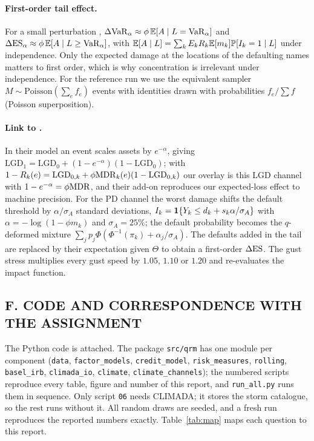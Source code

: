 \paragraph{First-order tail effect.} For a small perturbation \citep{Gourieroux00}, $\Delta\mathrm{VaR}_\alpha\approx\phi\,\mathbb{E}[A\mid L=\mathrm{VaR}_\alpha]$ and $\Delta\mathrm{ES}_\alpha\approx\phi\,\mathbb{E}[A\mid L\ge\mathrm{VaR}_\alpha]$, with $\mathbb{E}[A\mid L]=\sum_kE_kR_k\mathbb{E}[m_k]\mathbb{P}[I_k=1\mid L]$ under independence. Only the expected damage at the locations of the defaulting names matters to first order, which is why concentration is irrelevant under independence. For the reference run we use the equivalent sampler $M\sim\mathrm{Poisson}(\sum_ef_e)$ events with identities drawn with probabilities $f_e/\sum f$ (Poisson superposition).

\paragraph{Link to \citet{Pozdyshev25}.} In their model an event scales assets by $e^{-\alpha}$, giving $\mathrm{LGD}_1=\mathrm{LGD}_0+(1-e^{-\alpha})(1-\mathrm{LGD}_0)$; with $1-R_k(e)=\mathrm{LGD}_{0,k}+\phi\mathrm{MDR}_k(e)(1-\mathrm{LGD}_{0,k})$ our overlay is this LGD channel with $1-e^{-\alpha}=\phi\mathrm{MDR}$, and their add-on reproduces our expected-loss effect to machine precision. For the PD channel the worst damage shifts the default threshold by $\alpha/\sigma_A$ standard deviations, $I_k=\mathbf{1}\{Y_k\le d_k+s_k\alpha/\sigma_A\}$ with $\alpha=-\log(1-\phi m_k)$ and $\sigma_A=25\%$; the default probability becomes the $q$-deformed mixture $\sum_jp_j\Phi(\Phi^{-1}(\pi_k)+\alpha_j/\sigma_A)$. The defaults added in the tail are replaced by their expectation given $\Theta$ to obtain a first-order $\Delta\mathrm{ES}$. The gust stress multiplies every gust speed by $1.05$, $1.10$ or $1.20$ and re-evaluates the impact function.

\subsection*{F. CODE AND CORRESPONDENCE WITH THE ASSIGNMENT}
\sloppy The Python code is attached. The package \texttt{src/qrm} has one module per component (\texttt{data}, \texttt{factor\_models}, \texttt{credit\_model}, \texttt{risk\_measures}, \texttt{rolling}, \texttt{basel\_irb}, \texttt{climada\_io}, \texttt{climate}, \texttt{climate\_channels}); the numbered scripts reproduce every table, figure and number of this report, and \texttt{run\_all.py} runs them in sequence. Only script \texttt{06} needs CLIMADA; it stores the storm catalogue, so the rest runs without it. All random draws are seeded, and a fresh run reproduces the reported numbers exactly. Table~\ref{tab:map} maps each question to this report.

